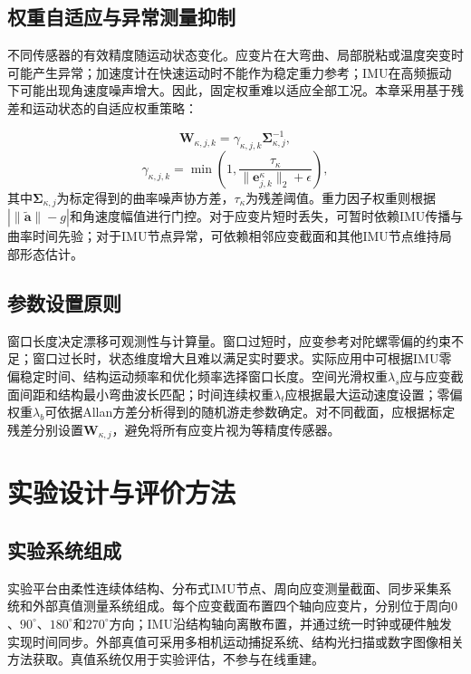\subsection{权重自适应与异常测量抑制}

不同传感器的有效精度随运动状态变化。应变片在大弯曲、局部脱粘或温度突变时可能产生异常；加速度计在快速运动时不能作为稳定重力参考；IMU在高频振动下可能出现角速度噪声增大。因此，固定权重难以适应全部工况。本章采用基于残差和运动状态的自适应权重策略：

\begin{equation}
    \bm W_{\kappa,j,k}
    =\gamma_{\kappa,j,k}\bm\Sigma_{\kappa,j}^{-1},
\end{equation}
\begin{equation}
    \gamma_{\kappa,j,k}
    =\min\left(
    1,
    \frac{\tau_{\kappa}}
    {\|\bm e_{j,k}^{\kappa}\|_2+\epsilon}
    \right),
\end{equation}
其中$\bm\Sigma_{\kappa,j}$为标定得到的曲率噪声协方差，$\tau_{\kappa}$为残差阈值。重力因子权重则根据$\left|\|\tilde{\bm a}\|-g\right|$和角速度幅值进行门控。对于应变片短时丢失，可暂时依赖IMU传播与曲率时间先验；对于IMU节点异常，可依赖相邻应变截面和其他IMU节点维持局部形态估计。

\subsection{参数设置原则}

窗口长度决定漂移可观测性与计算量。窗口过短时，应变参考对陀螺零偏的约束不足；窗口过长时，状态维度增大且难以满足实时要求。实际应用中可根据IMU零偏稳定时间、结构运动频率和优化频率选择窗口长度。空间光滑权重$\lambda_s$应与应变截面间距和结构最小弯曲波长匹配；时间连续权重$\lambda_t$应根据最大运动速度设置；零偏权重$\lambda_b$可依据Allan方差分析得到的随机游走参数确定。对不同截面，应根据标定残差分别设置$\bm W_{\kappa,j}$，避免将所有应变片视为等精度传感器。

\section{实验设计与评价方法}
\label{sec:experiment_design}

\subsection{实验系统组成}

实验平台由柔性连续体结构、分布式IMU节点、周向应变测量截面、同步采集系统和外部真值测量系统组成。每个应变截面布置四个轴向应变片，分别位于周向$0$、$90^{\circ}$、$180^{\circ}$和$270^{\circ}$方向；IMU沿结构轴向离散布置，并通过统一时钟或硬件触发实现时间同步。外部真值可采用多相机运动捕捉系统、结构光扫描或数字图像相关方法获取。真值系统仅用于实验评估，不参与在线重建。


